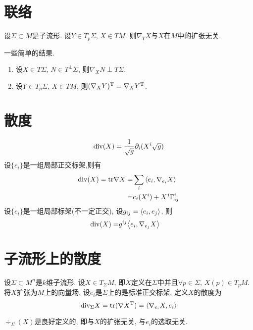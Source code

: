 \section{联络}
\begin{proposition}
    设$\Sigma \subset M$是子流形.  设$Y \in T_p\Sigma$, $X \in TM$. 则$\nabla_YX$与$X$在$M$中的扩张无关.
\end{proposition}
一些简单的结果.
\begin{enumerate}
    \item 设$X\in T\Sigma$, $N \in T^\perp\Sigma$, 则$\nabla_X N \perp T\Sigma$.
    \item 设$Y \in T_p \Sigma$, $X \in TM$, 则$(\nabla_XY)^{\text{T}}=\nabla_X{Y^{\text{T}}}$.
\end{enumerate}
\section{散度}
\begin{equation}
    {\text{div}}(X)={{\frac{1}{\sqrt{g}}}}{\partial}_i(X^i\sqrt{g})
\end{equation}
设$\{e_i\}$是一组局部正交标架,则有
\begin{equation}
    \begin{split}
        {\text{div}}(X)={\text{tr}}\nabla X=&\sum_i {\left < e_i, \nabla_{e_i}X \right >} \\
        =&e_i(X^i)+X^j\Gamma^i_{ij}
    \end{split}
\end{equation}
设$\{e_i\}$是一组局部标架(不一定正交), 设$g_{ij}={\left < e_i, e_j \right >}$, 则
\begin{equation}
    \begin{split}
        {\text{div}}(X)=&g^{ij}{\left < e_i, \nabla_{e_j}X \right >}
    \end{split}
\end{equation}
\section{子流形上的散度}
设$\Sigma \subset M^n$是$k$维子流形. 设$X \in T_\Sigma M$, 即$X$定义在$\Sigma$中并且$\forall p \in \Sigma$, $X(p) \in T_pM$. 将$X$扩张为$M$上的向量场.  设$e_i$是$\Sigma$上的是标准正交标架. 定义$X$的散度为
\begin{equation}
    {\text{div}}_\Sigma X={\text{tr}}(\nabla X^{\text{T}})={\left < \nabla_{e_i}X, e_i \right >}
\end{equation}
\begin{proposition}
    $\div_\Sigma(X)$是良好定义的, 即与$X$的扩张无关, 与$e_i$的选取无关.
\end{proposition}
